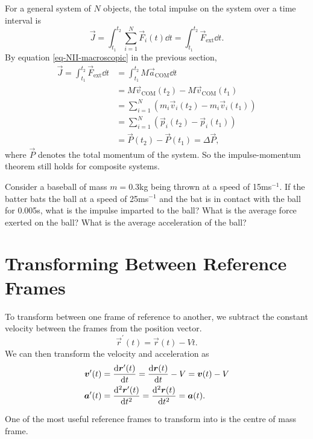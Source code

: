 \documentclass[../classical_mechanics.tex]{subfiles}
\begin{document}
        For a general system of $N$ objects, the total impulse on the system over a time interval is
        \begin{equation}
            \vec{J}=\int_{t_1}^{t_2}\sum_{i=1}^N\vec{F}_i(t)\dd{t}=\int_{t_1}^{t_2}\vec{F}_\text{ext}\dd{t}.
        \end{equation}
        By equation \ref{eq-NII-macroscopic} in the previous section,
        \begin{align}
            \vec{J}=\int_{t_1}^{t_2}\vec{F}_\text{ext}\dd{t}&=\int_{t_1}^{t_2}M\vec{a}_\text{COM}\dd{t}\\
            &=M\vec{v}_\text{COM}(t_2)-M\vec{v}_\text{COM}(t_1)\\
            &=\sum_{i=1}^N\left(m_i\vec{v}_i(t_2)-m_i\vec{v}_i(t_1)\right)\\
            &=\sum_{i=1}^N\left(\vec{p}_i(t_2)-\vec{p}_i(t_1)\right)\\
            &=\vec{P}(t_2)-\vec{P}(t_1)=\Delta\vec{P},
        \end{align}
        where $\vec{P}$ denotes the total momentum of the system.
        So the impulse-momentum theorem still holds for composite systems.
        \begin{example}
            Consider a baseball of mass $m=$0.3kg being thrown at a speed of 15ms$^{-1}$.
            If the batter bats the ball at a speed of 25ms$^{-1}$ and the bat is in contact with the ball for 0.005s, what is the impulse imparted to the ball?
            What is the average force exerted on the ball? What is the average acceleration of the ball?
        \end{example}

    \section{Transforming Between Reference Frames}\label{transforming-between-reference-frames}
        To transform between one frame of reference to another, we subtract the constant velocity between the frames from the position vector.
        \begin{equation}
            \vec{r}^\prime(t)=\vec{r}(t)-Vt.
        \end{equation}
        We can then transform the velocity and acceleration as
        \begin{align}
            \vec{v}^\prime(t)&=\dv{\vec{r}^\prime(t)}{t}=\dv{\vec{r}(t)}{t}-V=\vec{v}(t)-V\\
            \vec{a}^\prime(t)&=\dv[2]{\vec{r}^\prime(t)}{t}=\dv[2]{\vec{r}(t)}{t}=\vec{a}(t).
        \end{align}

        One of the most useful reference frames to transform into is the centre of mass frame.
\end{document}
